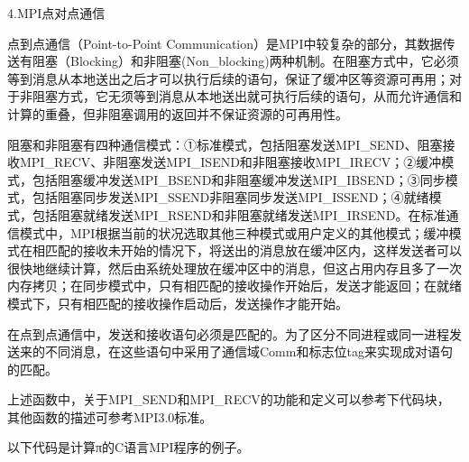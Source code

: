 \documentclass[]{ctexbook}
\begin{document}
4.MPI点对点通信

点到点通信（Point-to-Point Communication）是MPI中较复杂的部分，其数据传送有阻塞（Blocking）和非阻塞(Non\_blocking)两种机制。在阻塞方式中，它必须等到消息从本地送出之后才可以执行后续的语句，保证了缓冲区等资源可再用；对于非阻塞方式，它无须等到消息从本地送出就可执行后续的语句，从而允许通信和计算的重叠，但非阻塞调用的返回并不保证资源的可再用性。

阻塞和非阻塞有四种通信模式：①标准模式，包括阻塞发送MPI\_SEND、阻塞接收MPI\_RECV、非阻塞发送MPI\_ISEND和非阻塞接收MPI\_IRECV；②缓冲模式，包括阻塞缓冲发送MPI\_BSEND和非阻塞缓冲发送MPI\_IBSEND；③同步模式，包括阻塞同步发送MPI\_SSEND非阻塞同步发送MPI\_ISSEND；④就绪模式，包括阻塞就绪发送MPI\_RSEND和非阻塞就绪发送MPI\_IRSEND。在标准通信模式中，MPI根据当前的状况选取其他三种模式或用户定义的其他模式；缓冲模式在相匹配的接收未开始的情况下，将送出的消息放在缓冲区内，这样发送者可以很快地继续计算，然后由系统处理放在缓冲区中的消息，但这占用内存且多了一次内存拷贝；在同步模式中，只有相匹配的接收操作开始后，发送才能返回；在就绪模式下，只有相匹配的接收操作启动后，发送操作才能开始。

在点到点通信中，发送和接收语句必须是匹配的。为了区分不同进程或同一进程发送来的不同消息，在这些语句中采用了通信域Comm和标志位tag来实现成对语句的匹配。

上述函数中，关于MPI\_SEND和MPI\_RECV的功能和定义可以参考下代码块，其他函数的描述可参考MPI3.0标准。

以下代码是计算π的C语言MPI程序的例子。
\end{document}
